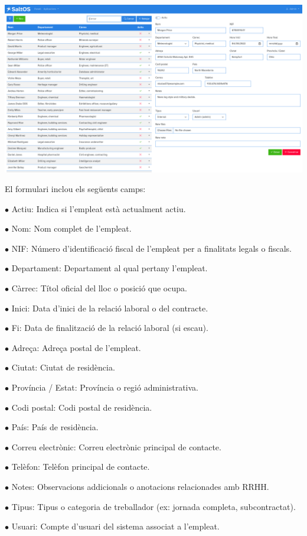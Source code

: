\documentclass[a4paper]{article}
\begin{document}
\begin{center}\includegraphics[width=1\textwidth]{../ujest/snaps/test-screenshots-js-screenshots-hr-employees-edit-100-ca-es-1-snap.png}\end{center}

El formulari inclou els següents camps:

\begin{compactitem}
\item[\color{myblue}$\bullet$] Actiu: Indica si l'empleat està actualment actiu.
\item[\color{myblue}$\bullet$] Nom: Nom complet de l'empleat.
\item[\color{myblue}$\bullet$] NIF: Número d'identificació fiscal de l'empleat per a finalitats legals o fiscals.
\item[\color{myblue}$\bullet$] Departament: Departament al qual pertany l'empleat.
\item[\color{myblue}$\bullet$] Càrrec: Títol oficial del lloc o posició que ocupa.
\item[\color{myblue}$\bullet$] Inici: Data d'inici de la relació laboral o del contracte.
\item[\color{myblue}$\bullet$] Fi: Data de finalització de la relació laboral (si escau).
\item[\color{myblue}$\bullet$] Adreça: Adreça postal de l'empleat.
\item[\color{myblue}$\bullet$] Ciutat: Ciutat de residència.
\item[\color{myblue}$\bullet$] Província / Estat: Província o regió administrativa.
\item[\color{myblue}$\bullet$] Codi postal: Codi postal de residència.
\item[\color{myblue}$\bullet$] País: País de residència.
\item[\color{myblue}$\bullet$] Correu electrònic: Correu electrònic principal de contacte.
\item[\color{myblue}$\bullet$] Telèfon: Telèfon principal de contacte.
\item[\color{myblue}$\bullet$] Notes: Observacions addicionals o anotacions relacionades amb RRHH.
\item[\color{myblue}$\bullet$] Tipus: Tipus o categoria de treballador (ex: jornada completa, subcontractat).
\item[\color{myblue}$\bullet$] Usuari: Compte d'usuari del sistema associat a l'empleat.
\end{compactitem}
\end{document}
